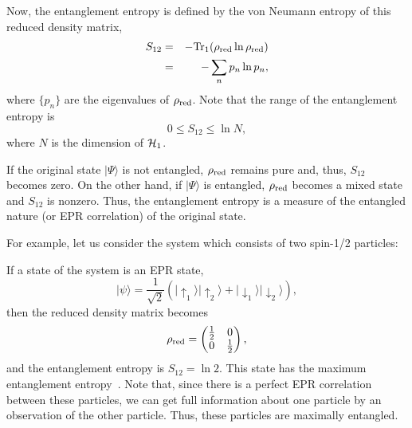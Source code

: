 \documentclass[12pt,epsf]{article}
\begin{document}
Now, the entanglement entropy is defined by the von Neumann
entropy of this reduced density matrix,
\begin{eqnarray}
   S_{12} &=&-{\rm Tr}_1 (\rho_{{\rm red}}\ln\rho_{{\rm red}})
             \nonumber \\
         &=&-\sum_n p_n\ln p_n,
\end{eqnarray}
where $\{p_n\}$ are the eigenvalues of $\rho_{{\rm red}}$.
Note that the range of the entanglement entropy is
\begin{equation}
   0\le S_{12} \le \ln N,
\end{equation}
where $N$ is the dimension of ${\cal H}_1$.

If the original state $|\Psi\rangle$ is not entangled,
$\rho_{{\rm red}}$ remains pure and,
thus, $S_{12}$ becomes zero.
On the other hand, if $|\Psi\rangle$ is entangled,
$\rho_{{\rm red}}$ becomes a mixed state and
$S_{12}$ is nonzero.
Thus, the entanglement entropy is a measure of
the entangled nature (or EPR correlation)
of the original state.

For example, let us consider the system
which consists of two spin-1/2 particles:

If a state of the system
is an EPR state,
\begin{equation}
  |\psi\rangle=\frac{1}{\sqrt{2}}
     \left(|\uparrow_1\rangle|\uparrow_2\rangle
   +|\downarrow_1\rangle|\downarrow_2\rangle\right),
\end{equation}
then the reduced density matrix becomes
\begin{equation}
\rho_{{\rm red}}=\begin{pmatrix} \frac{1}{2} &      0      \cr
                      0      & \frac{1}{2} \cr \end{pmatrix},
\end{equation}
and the entanglement entropy is $S_{12}=\ln2$.
This state has the maximum entanglement entropy~\cite{Mukohy98}.
Note that, since there is a perfect EPR correlation
between these particles,
we can get full information about one particle by 
an observation of the other particle.
Thus, these particles are maximally entangled.
\end{document}
